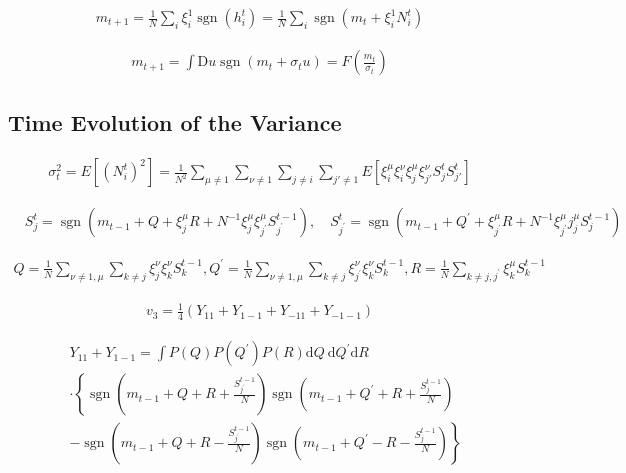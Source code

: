 \documentclass{article}
\begin{document}
\begin{align*}
m_{t+1} = \frac{1}{N} \sum_i \xi_i^1 \operatorname{sgn}(h_i^t) = \frac{1}{N} \sum_i \operatorname{sgn}\left( m_t + \xi_i^1 N_i^t \right)\tag{7.61}
\end{align*}

\begin{align*}
m_{t+1} = \int \mathrm{D}u \operatorname{sgn}(m_t + \sigma_t u) = F\left( \frac{m_t}{\sigma_t} \right)\tag{7.62}
\end{align*}

\subsection{Time Evolution of the Variance}

\begin{align*}
\sigma_t^2 = E\left[ \left( N_i^t \right)^2 \right] = \frac{1}{N^2} \sum_{\mu \neq 1} \sum_{\nu \neq 1} \sum_{j \neq i} \sum_{j' \neq 1} E\left[ \xi_i^\mu \xi_i^\nu \xi_j^\mu \xi_{j'}^\nu S_j^t S_{j'}^t \right]\tag{7.63}
\end{align*}

\begin{align*}
& S_{j}^{t}=\operatorname{sgn}\left(m_{t-1}+Q+\xi_{j}^{\mu} R+N^{-1} \xi_{j}^{\mu} \xi_{j^{\prime}}^{\mu} S_{j^{\prime}}^{t-1}\right), \quad 
S_{j^{\prime}}^{t}=\operatorname{sgn}\left(m_{t-1}+Q^{\prime}+\xi_{j^{\prime}}^{\mu} R+N^{-1} \xi_{j^{\prime}}^{\mu} j_{j}^{\mu} S_{j}^{t-1}\right)
\tag{7.64}
\end{align*}

\begin{align*}
Q=\frac{1}{N} \sum_{\nu \neq 1, \mu} \sum_{k \neq j} \xi_{j}^{\nu} \xi_{k}^{\nu} S_{k}^{t-1}, Q^{\prime}=\frac{1}{N} \sum_{\nu \neq 1, \mu} \sum_{k \neq j} \xi_{j^{\prime}}^{\nu} \xi_{k}^{\nu} S_{k}^{t-1}, R=\frac{1}{N} \sum_{k \neq j, j^{\prime}} \xi_{k}^{\mu} S_{k}^{t-1}\tag{7.65}
\end{align*}

\begin{align*}
v_{3}=\frac{1}{4}\left(Y_{11}+Y_{1-1}+Y_{-11}+Y_{-1-1}\right)\tag{7.66}
\end{align*}

\begin{align*}
& Y_{11}+Y_{1-1}=\int P(Q) P\left(Q^{\prime}\right) P(R) \mathrm{d} Q \mathrm{~d} Q^{\prime} \mathrm{d} R \\
& \cdot\left\{\operatorname{sgn}\left(m_{t-1}+Q+R+\frac{S_{j^{\prime}}^{t-1}}{N}\right) \operatorname{sgn}\left(m_{t-1}+Q^{\prime}+R+\frac{S_{j}^{t-1}}{N}\right)\right. \\
& \left.-\operatorname{sgn}\left(m_{t-1}+Q+R-\frac{S_{j^{\prime}}^{t-1}}{N}\right) \operatorname{sgn}\left(m_{t-1}+Q^{\prime}-R-\frac{S_{j}^{t-1}}{N}\right)\right\}
\tag{7.67}
\end{align*}
\end{document}
